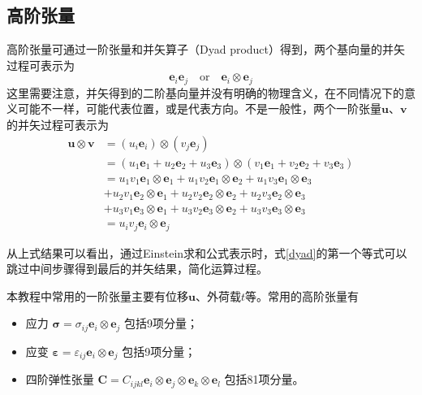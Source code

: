 \subsection{高阶张量}
高阶张量可通过一阶张量和并矢算子（Dyad product）得到，两个基向量的并矢过程可表示为
\begin{equation}
    \boldsymbol e_i \boldsymbol e_j \quad \mathrm{or} \quad \boldsymbol e_i \otimes \boldsymbol e_j
\end{equation}
这里需要注意，并矢得到的二阶基向量并没有明确的物理含义，在不同情况下的意义可能不一样，可能代表位置，或是代表方向。不是一般性，两个一阶张量$\boldsymbol u$、$\boldsymbol v$ 的并矢过程可表示为
\begin{equation}\label{ch_introduction:dyad}
    \begin{split}
        \boldsymbol u \otimes \boldsymbol v &= (u_i \boldsymbol e_i) \otimes (v_j \boldsymbol e_j) \\
                                            &= (u_1 \boldsymbol e_1 + u_2 \boldsymbol e_2 + u_3 \boldsymbol e_3) \otimes
                                               (v_1 \boldsymbol e_1 + v_2 \boldsymbol e_2 + v_3 \boldsymbol e_3) \\
                                            &= u_1 v_1 \boldsymbol e_1 \otimes \boldsymbol e_1
                                            +  u_1 v_2 \boldsymbol e_1 \otimes \boldsymbol e_2
                                            +  u_1 v_3 \boldsymbol e_1 \otimes \boldsymbol e_3 \\
                                            &+ u_2 v_1 \boldsymbol e_2 \otimes \boldsymbol e_1
                                            +  u_2 v_2 \boldsymbol e_2 \otimes \boldsymbol e_2
                                            +  u_2 v_3 \boldsymbol e_2 \otimes \boldsymbol e_3 \\
                                            &+ u_3 v_1 \boldsymbol e_3 \otimes \boldsymbol e_1
                                            +  u_3 v_2 \boldsymbol e_3 \otimes \boldsymbol e_2
                                            +  u_3 v_3 \boldsymbol e_3 \otimes \boldsymbol e_3 \\
                                            &= u_i v_j \boldsymbol e_i \otimes \boldsymbol e_j
    \end{split}
\end{equation}\par
从上式结果可以看出，通过Einstein求和公式表示时，式\eqref{dyad}的第一个等式可以跳过中间步骤得到最后的并矢结果，简化运算过程。 \par
本教程中常用的一阶张量主要有位移$\boldsymbol u$、外荷载$t$等。常用的高阶张量有
\begin{itemize}
    \item 应力 $\boldsymbol \sigma = \sigma_{ij} \boldsymbol e_i \otimes \boldsymbol e_j$ 包括9项分量；
    \item 应变 $\boldsymbol \varepsilon = \varepsilon_{ij} \boldsymbol e_i \otimes \boldsymbol e_j$ 包括9项分量；
    \item 四阶弹性张量 $\boldsymbol C = C_{ijkl} \boldsymbol e_i \otimes \boldsymbol e_j \otimes \boldsymbol e_k \otimes \boldsymbol e_l$ 包括81项分量。
\end{itemize}

